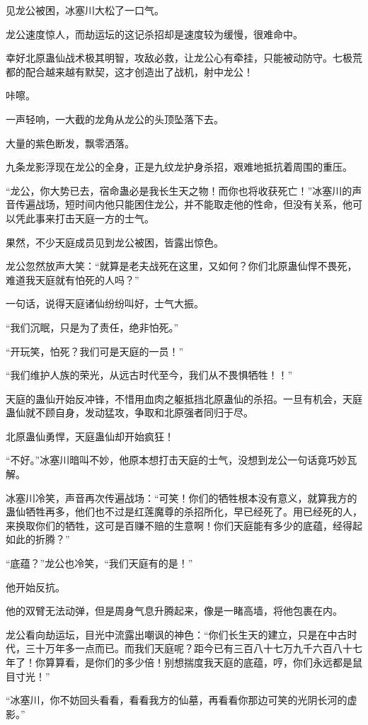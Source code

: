 \begin{this_body}
见龙公被困，冰塞川大松了一口气。

龙公速度惊人，而劫运坛的这记杀招却是速度较为缓慢，很难命中。

幸好北原蛊仙战术极其明智，攻敌必救，让龙公心有牵挂，只能被动防守。七极荒都的配合越来越有默契，这才创造出了战机，射中龙公！

咔嚓。

一声轻响，一大截的龙角从龙公的头顶坠落下去。

大量的紫色断发，飘零洒落。

九条龙影浮现在龙公的全身，正是九纹龙护身杀招，艰难地抵抗着周围的重压。

“龙公，你大势已去，宿命蛊必是我长生天之物！而你也将收获死亡！”冰塞川的声音传遍战场，短时间内他只能困住龙公，并不能取走他的性命，但没有关系，他可以凭此事来打击天庭一方的士气。

果然，不少天庭成员见到龙公被困，皆露出惊色。

龙公忽然放声大笑：“就算是老夫战死在这里，又如何？你们北原蛊仙悍不畏死，难道我天庭就有怕死的人吗？”

一句话，说得天庭诸仙纷纷叫好，士气大振。

“我们沉眠，只是为了责任，绝非怕死。”

“开玩笑，怕死？我们可是天庭的一员！”

“我们维护人族的荣光，从远古时代至今，我们从不畏惧牺牲！！”

天庭的蛊仙开始反冲锋，不惜用血肉之躯抵挡北原蛊仙的杀招。一旦有机会，天庭蛊仙就不顾自身，发动猛攻，争取和北原强者同归于尽。

北原蛊仙勇悍，天庭蛊仙却开始疯狂！

“不好。”冰塞川暗叫不妙，他原本想打击天庭的士气，没想到龙公一句话竟巧妙瓦解。

冰塞川冷笑，声音再次传遍战场：“可笑！你们的牺牲根本没有意义，就算我方的蛊仙牺牲再多，他们也不过是红莲魔尊的杀招所化，早已经死了。用已经死的人，来换取你们的牺牲，这可是百赚不赔的生意啊！你们天庭能有多少的底蕴，经得起如此的折腾？”

“底蕴？”龙公也冷笑，“我们天庭有的是！”

他开始反抗。

他的双臂无法动弹，但是周身气息升腾起来，像是一睹高墙，将他包裹在内。

龙公看向劫运坛，目光中流露出嘲讽的神色：“你们长生天的建立，只是在中古时代，三十万年多一点而已。而我们天庭呢？距今已有三百八十七万九千六百八十七年了！你算算看，是你们的多少倍！别想揣度我天庭的底蕴，哼，你们永远都是鼠目寸光！”

“冰塞川，你不妨回头看看，看看我方的仙墓，再看看你那边可笑的光阴长河的虚影。”


\end{this_body}

